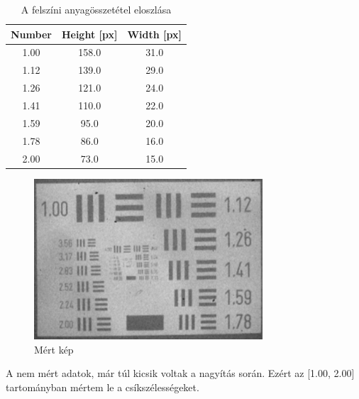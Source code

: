 \documentclass[a4paper,12pt]{article}
\begin{document}
\begin{table}[H]
	\centering
	\begin{tabular}{|c|c|c|} \hline
		Number & Height [px] & Width [px] \\ \hline
		1.00 & 158.0 &  31.0 \\ \hline
		1.12 & 139.0 & 29.0 \\ \hline
		1.26 & 121.0 & 24.0 \\ \hline
		1.41 & 110.0 & 22.0 \\ \hline
		1.59 & 95.0 & 20.0 \\ \hline
		1.78 & 86.0 & 16.0 \\ \hline
		2.00 & 73.0 & 15.0 \\ \hline
	\end{tabular}
	\caption{A felszíni anyagösszetétel eloszlása}
\end{table}

\begin{figure}[H]
	\centering
	\includegraphics[width=0.76\textwidth]{./Jcsop/chip2bigMeasured.png}
	\caption{Mért kép}
\end{figure}

\par A nem mért adatok, már túl kicsik voltak a nagyítás során. Ezért az [1.00, 2.00] 
tartományban mértem le a csíkszélességeket.
\end{document}
